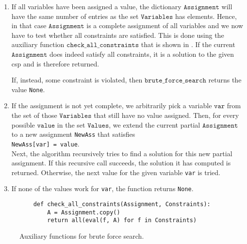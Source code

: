 \begin{enumerate}
\item If all variables have been assigned a value, the dictionary $\texttt{Assignment}$ will have the same
      number of entries as the set $\texttt{Variables}$ has elements.  Hence, in that case
      $\texttt{Assignment}$ is a complete assignment of all variables and we now have to test whether
      all constraints are satisfied.  This is done using the auxiliary function
      $\texttt{check\_all\_constraints}$ that is shown in . 
      If the current $\texttt{Assignment}$ does indeed satisfy all constraints, it is a solution to the given
      \ac{csp} and is therefore returned.

      If, instead, some constraint is violated, then $\texttt{brute\_force\_search}$ returns the value
      \texttt{None}.
\item If the assignment is not yet complete, we arbitrarily 
      pick a variable $\texttt{var}$ from the set of those $\texttt{Variables}$ that still have no value assigned.  
      Then, for every possible  $\texttt{value}$ in the set $\texttt{Values}$, we extend the current partial
      $\texttt{Assignment}$ to a new assignment \texttt{NewAss} that satisfies
      \\[0.2cm]
      \hspace*{1.3cm}
      \texttt{NewAss[var] = value}.
      \\[0.2cm]
      Next, the algorithm recursively tries to find a solution for this new partial assignment.
      If this recursive call succeeds, the solution it has computed is returned.  Otherwise, the next value
      for the given variable \texttt{var} is tried.
\item If none of the values work for \texttt{var}, the function returns \texttt{None}.
\end{enumerate}


\begin{figure}[!ht]
\centering
\begin{verbatim}
    def check_all_constraints(Assignment, Constraints):
        A = Assignment.copy()
        return all(eval(f, A) for f in Constraints)
\end{verbatim}
\vspace*{-0.3cm}
\caption{Auxiliary functions for brute force search.}
\label{fig:Brute-Force-Solver.ipynb-2}
\end{figure}

